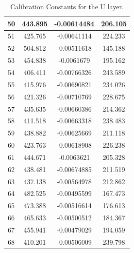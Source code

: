\begin{table}[h]
{\begin{tabular}{|c|c|c|c|}
50   &   443.895   &   -0.00614484   &   206.105  \\  \hline  
51   &   425.765   &   -0.00641114   &   224.233  \\  \hline  
52   &   504.812   &   -0.00511618   &   145.188  \\  \hline  
53   &   454.838   &   -0.0061679   &   195.162  \\  \hline  
54   &   406.411   &   -0.00766326   &   243.589  \\  \hline  
55   &   415.976   &   -0.00690821   &   234.026  \\  \hline  
56   &   421.326   &   -0.00710769   &   228.675  \\  \hline  
57   &   435.635   &   -0.00660386   &   214.362  \\  \hline  
58   &   411.518   &   -0.00663318   &   238.483  \\  \hline  
59   &   438.882   &   -0.00625669   &   211.118  \\  \hline  
60   &   423.763   &   -0.00618908   &   226.238  \\  \hline  
61   &   444.671   &   -0.0063621   &   205.328  \\  \hline  
62   &   438.481   &   -0.00674885   &   211.519  \\  \hline  
63   &   437.138   &   -0.00564978   &   212.862  \\  \hline  
64   &   482.525   &   -0.00495599   &   167.473  \\  \hline  
65   &   473.388   &   -0.00516614   &   176.613  \\  \hline  
66   &   465.633   &   -0.00500512   &   184.367  \\  \hline  
67   &   455.941   &   -0.00479029   &   194.059  \\  \hline  
68   &   410.201   &   -0.00506009   &   239.798  \\  \hline  
        \end{tabular}
        }
        \caption{Calibration Constants for the U layer.}
        \label{tab:UattenC}
\end{table}


